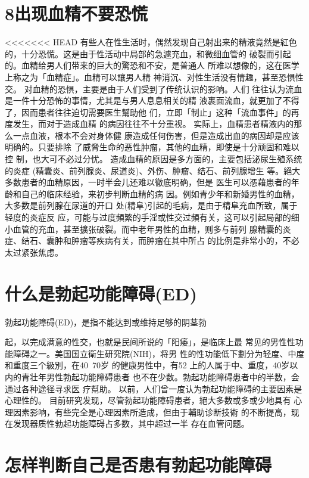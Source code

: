 \documentclass[12pt,UTF8]{ctexbook}
\begin{document}
\section{8出现血精不要恐慌}
<<<<<<< HEAD
有些人在性生活时，偶然发现自己射出来的精液竟然是紅色
的，十分恐慌。这是由于性活动中局部的急遽充血，和微细血管的
破裂而引起的。血精给男人们带来的巨大的驚恐和不安，是普通人
所难以想像的，这在医学上称之为「血精症」。血精可以讓男人精
神消沉、对性生活没有情趣，甚至恐惧性交。
对血精的恐惧，主要是由于人们受到了传统认识的影响。人们
往往认为流血是一件十分恐怖的事情，尤其是与男人息息相关的精
液裹面流血，就更加了不得了，因而患者往往迫切需要医生幫助他
们，立即「制止」这种「流血事件」的再度发生，而对于造成血精
的病因往往不十分重视。
实际上，血精患者精液内的那么一点血液，根本不会对身体健
康造成任何伤害，但是造成出血的病因却是应该明确的。只要排除
了威脅生命的恶性肿瘤，其他的血精，即使是十分顽固和难以控
制，也大可不必过分忧。
造成血精的原因是多方面的，主要包括泌尿生殖系统的炎症
(精囊炎、前列腺炎、尿道炎)、外伤、肿瘤、结石、前列腺增生
等。絕大多数患者的血精原因，一时半会儿还难以徹底明确，但是
医生可以憑藉患者的年龄和自己的临床经验，来初步判断血精的病
因。例如青少年和新婚男性的血精，大多数是前列腺在尿道的开口
处(精阜)引起的毛病，是由于精阜充血所致，属于轻度的炎症反
应，可能与过度頻繁的手淫或性交过頻有关，这可以引起局部的细
小血管的充血，甚至擴张破裂。而中老年男性的血精，则多与前列
腺精囊的炎症、结石、囊肿和肿瘤等疾病有关，而肿瘤在其中所占
的比例是非常小的，不必太过紧张焦虑。
\section{什么是勃起功能障碍(ED)}
勃起功能障碍(ED)，是指不能达到或维持足够的阴茎勃

起，以完成满意的性交，也就是民间所说的「阳痿」，是临床上最
常见的男性性功能障碍之一。美国国立衛生研究院(NIH)，将男
性的性功能低下劃分为轻度、中度和重度三个級別，在40~70岁
的健康男性中，有52%
上的人属于中、重度，40岁以内的青壮年男性勃起功能障碍患者
也不在少数。勃起功能障碍患者中的半数，会通过各种途径寻求医
疗幫助。
以前，人们曾一度认为勃起功能障碍的主要因素是心理性的。
目前研究发现，尽管勃起功能障碍患者，絕大多数或多或少地具有
心理因素影响，有些完全是心理因素所造成，但由于輔助诊断技術
的不断提高，现在发现器质性勃起功能障碍占多数，其中超过一半
存在血管问题。

\section{怎样判断自己是否患有勃起功能障碍}
\end{document}
